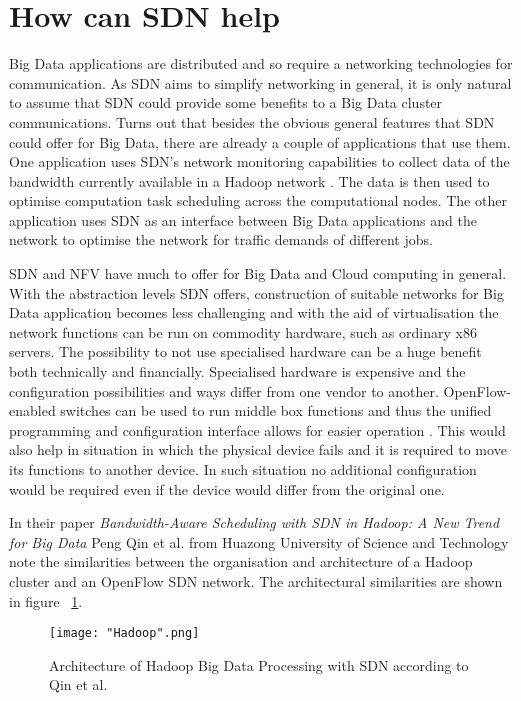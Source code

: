\documentclass{acm_proc_article-sp}
\begin{document}
\section{How can SDN help}

Big Data applications are distributed and so require a networking technologies for communication. As SDN aims to simplify networking in general, it is only natural to assume that SDN could provide some benefits to a Big Data cluster communications. Turns out that besides the obvious general features that SDN could offer for Big Data, there are already a couple of applications that use them. One application uses SDN's network monitoring capabilities to collect data of the bandwidth currently available in a Hadoop network \cite{Scheduling}. The data is then used to optimise computation task scheduling across the computational nodes. The other application uses SDN as an interface between Big Data applications and the network to optimise the network for traffic demands of different jobs.

SDN and NFV have much to offer for Big Data and Cloud computing in general. With the abstraction levels SDN offers, construction of suitable networks for Big Data application becomes less challenging and with the aid of virtualisation the network functions can be run on commodity hardware, such as ordinary x86 servers. The possibility to not use specialised hardware can be a huge benefit both technically and financially. Specialised hardware is expensive and the configuration possibilities and ways differ from one vendor to another. OpenFlow-enabled switches can be used to run middle box functions and thus the unified programming and configuration interface allows for easier operation . This would also help in situation in which the physical device fails and it is required to move its functions to another device. In such situation no additional configuration would be required even if the device would differ from the original one.

In their paper \textit{Bandwidth-Aware Scheduling with SDN in Hadoop: A New Trend for Big Data} \cite{Scheduling} Peng Qin et al. from Huazong University of Science and Technology note the similarities between the organisation and architecture of a Hadoop cluster and an OpenFlow SDN network. The architectural similarities are shown in figure ~\ref{fig:hadoop}.

\begin{figure}[ht!]
\centering
{}
\texttt{[image: "Hadoop".png]}
\caption{Architecture of Hadoop Big Data Processing with SDN according to Qin et al. \cite{Scheduling}}
\label{fig:hadoop}
\end{figure} 
\end{document}
